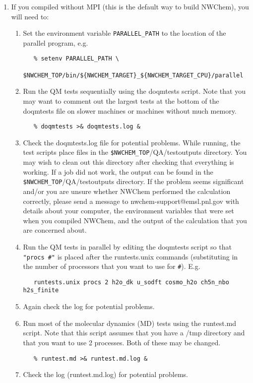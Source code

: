 \begin{enumerate}
\item If you compiled without MPI (this is the default way to build NWChem),
   you will need to:
\begin{enumerate}
   \item Set the environment variable \verb+PARALLEL_PATH+ to the 
      location of the parallel program, e.g.
   \begin{verbatim}
   % setenv PARALLEL_PATH \
     $NWCHEM_TOP/bin/${NWCHEM_TARGET}_${NWCHEM_TARGET_CPU}/parallel
   \end{verbatim}
   \item Run the QM tests sequentially using the doqmtests script.  Note
      that you may want to comment out the largest tests at the bottom
      of the doqmtests file on slower machines or machines without much
      memory.
   \begin{verbatim}
   % doqmtests >& doqmtests.log &
   \end{verbatim}
   \item Check the doqmtests.log file for potential problems.  While running,
      the test scripts place files in the \verb+$NWCHEM_TOP+/QA/testoutputs
      directory.  You may wish to clean out this directory after checking
      that everything is working.  If a job did not work, the output can
      be found in the \verb+$NWCHEM_TOP+/QA/testoutputs directory.  If the problem
      seems significant and/or you are unsure whether NWChem performed the
      calculation correctly, please send a message to 
      nwchem-support@emsl.pnl.gov
      with details about your computer, the environment variables that were
      set when you compiled NWChem, and the output of the calculation that
      you are concerned about.
   \item Run the QM tests in parallel by editing the doqmtests script so that
      \verb+"procs #"+ is placed after the runtests.unix commands (substituting
      in the number of processors that you want to use for \verb+#+). E.g.
   \begin{verbatim}
   runtests.unix procs 2 h2o_dk u_sodft cosmo_h2o ch5n_nbo h2s_finite
   \end{verbatim}
   \item Again check the log for potential problems.
   \item Run most of the molecular dynamics (MD) tests using the runtest.md
      script.  Note that this script assumes that you have a /tmp directory
      and that you want to use 2 processes.  Both of these may be changed.
   \begin{verbatim}
   % runtest.md >& runtest.md.log &
   \end{verbatim}
   \item Check the log (runtest.md.log) for potential problems.
   \end{enumerate}


\end{enumerate}
